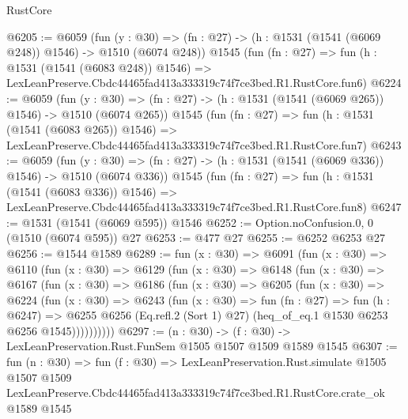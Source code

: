 \begin{lexlean}{RustCore}
\begin{coremodule}
@6205 := @6059
    (fun (y : @30) => (fn : @27) -> (h : @1531 (@1541 (@6069 @248)) @1546) -> @1510 (@6074 @248))
    @1545
    (fun (fn : @27) =>
    fun (h : @1531 (@1541 (@6083 @248)) @1546) =>
    LexLeanPreserve.Cbdc44465fad413a333319c74f7ce3bed.R1.RustCore.fun6)
@6224 := @6059
    (fun (y : @30) => (fn : @27) -> (h : @1531 (@1541 (@6069 @265)) @1546) -> @1510 (@6074 @265))
    @1545
    (fun (fn : @27) =>
    fun (h : @1531 (@1541 (@6083 @265)) @1546) =>
    LexLeanPreserve.Cbdc44465fad413a333319c74f7ce3bed.R1.RustCore.fun7)
@6243 := @6059
    (fun (y : @30) => (fn : @27) -> (h : @1531 (@1541 (@6069 @336)) @1546) -> @1510 (@6074 @336))
    @1545
    (fun (fn : @27) =>
    fun (h : @1531 (@1541 (@6083 @336)) @1546) =>
    LexLeanPreserve.Cbdc44465fad413a333319c74f7ce3bed.R1.RustCore.fun8)
@6247 := @1531 (@1541 (@6069 @595)) @1546
@6252 := Option.noConfusion.{0, 0} (@1510 (@6074 @595)) @27
@6253 := @477 @27
@6255 := @6252 @6253 @27
@6256 := @1544 @1589
@6289 := fun (x : @30) =>
  @6091
    (fun (x : @30) =>
    @6110
      (fun (x : @30) =>
      @6129
        (fun (x : @30) =>
        @6148
          (fun (x : @30) =>
          @6167
            (fun (x : @30) =>
            @6186
              (fun (x : @30) =>
              @6205
                (fun (x : @30) =>
                @6224
                  (fun (x : @30) =>
                  @6243
                    (fun (x : @30) =>
                    fun (fn : @27) =>
                    fun (h : @6247) =>
                    @6255
                      @6256
                      (Eq.refl.{2} (Sort 1) @27)
                      (heq_of_eq.{1} @1530 @6253 @6256 @1545))))))))))
@6297 := (n : @30) -> (f : @30) -> LexLeanPreservation.Rust.FunSem @1505 @1507 @1509 @1589 @1545
@6307 := fun (n : @30) =>
  fun (f : @30) =>
  LexLeanPreservation.Rust.simulate
    @1505
    @1507
    @1509
    LexLeanPreserve.Cbdc44465fad413a333319c74f7ce3bed.R1.RustCore.crate_ok
    @1589
    @1545
\end{coremodule}
\end{lexlean}
